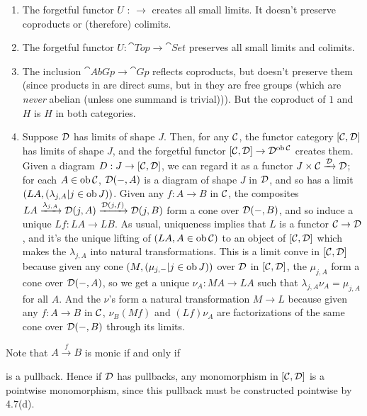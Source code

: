 \documentclass{article}
\begin{document}
\begin{exs}\hspace{0.1cm}
    \begin{enumerate}
        \item[(a)] The forgetful functor $U$ :  $\to$  creates all small limits. It doesn't preserve coproducts or (therefore) colimits.
        \item[(b)] The forgetful functor $U : \cat{Top} \to \cat{Set}$ preserves all small limits and colimits.
        \item[(c)] The inclusion $\cat{AbGp} \to \cat{Gp}$ reflects coproducts, but doesn't preserve them (since products in  are direct sums, but in  they are free groups (which are \textit{never} abelian (unless one summand is trivial))). But the coproduct of ${1}$ and $H$ is $H$ in both categories.
        \item[(d)] Suppose \newlec $\mathcal{D}$ has limits of shape $J$. Then, for any $\mathcal{C}$, the functor category $[\mathcal{C}, \mathcal{D}]$ has limits of shape $J$, and the forgetful functor $[\mathcal{C}, \mathcal{D}] \to \mathcal{D}^{\operatorname{ob} \mathcal{C}}$ creates them. Given a diagram $D: J \to [\mathcal{C}, \mathcal{D}]$, we can regard it as a functor $J \times \mathcal{C} \xrightarrow{\mathcal{D}} \mathcal{D}$; for each $A \in \operatorname{ob} \mathcal{C}$, $\mathcal{D}( - , A)$ is a diagram of shape $J$ in $\mathcal{D}$, and so has a limit $(LA, (\lambda_{j,A} | j \in \operatorname{ob} J))$. Given any $f: A \to B$ in $\mathcal{C}$, the composites $LA \xrightarrow{\lambda_{j,A}} \mathcal{D}(j,A) \xrightarrow{\mathcal{D}(j,f)} \mathcal{D}(j,B)$ form a cone over $\mathcal{D}(-, B)$, and so induce a unique $Lf : LA \to LB$. As usual, uniqueness implies that $L$ is a functor $\mathcal{C} \to \mathcal{D}$, and it's the unique lifting of $(LA, A \in \operatorname{ob} \mathcal{C})$ to an object of $[\mathcal{C}, \mathcal{D}]$ which makes the $\lambda_{j,A}$ into natural transformations. This is a limit conve in $[\mathcal{C}, \mathcal{D}]$ because given any cone $(M, (\mu_{j, - } | j \in \operatorname{ob} J))$ over $\mathcal{D}$ in $[\mathcal{C}, \mathcal{D}]$, the $\mu_{j,A}$ form a cone over $\mathcal{D}(-,A)$, so we get a unique $\nu_{A} : MA \to LA$ such that $\lambda_{j,A}\nu_{A} = \mu_{j,A}$ for all $A$. And the $\nu$'s form a natural transformation $M \to L$ because given any $f: A \to B$ in $\mathcal{C}$, $\nu_{B}(Mf)$ and $(Lf)\nu_{A}$ are factorizations of the same cone over $\mathcal{D}(-, B)$ through its limits.
    \end{enumerate}
\end{exs}
\begin{remark}
    Note that $A \xrightarrow{f} B$ is monic if and only if \begin{center}
    \end{center}
    is a pullback. Hence if $\mathcal{D}$ has pullbacks, any monomorphism in $[\mathcal{C}, \mathcal{D}]$ is a pointwise monomorphism, since this pullback must be constructed pointwise by 4.7(d).
\end{remark}
\end{document}

